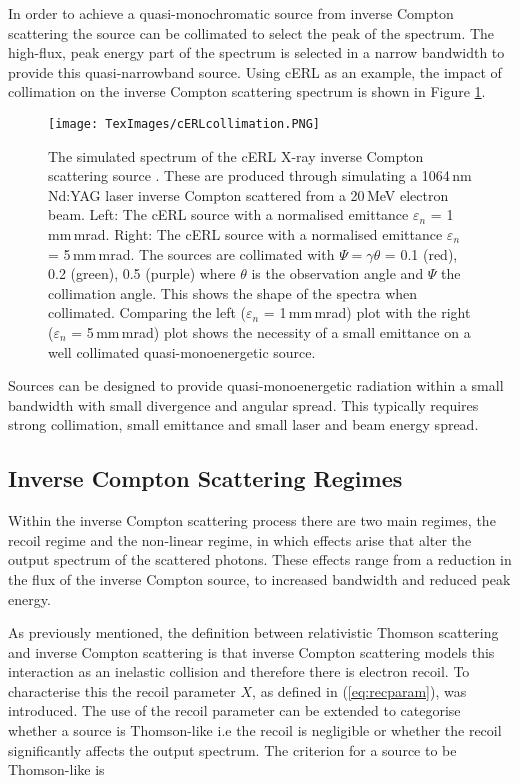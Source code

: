 \documentclass[11pt]{article}
\begin{document}
In order to achieve a quasi-monochromatic source from inverse Compton scattering the source can be collimated to select the peak of the spectrum. The high-flux, peak energy part of the spectrum is selected in a narrow bandwidth to provide this quasi-narrowband source. Using cERL as an example, the impact of collimation on the inverse Compton scattering spectrum is shown in Figure \ref{fig:cERLcoll}.

\begin{figure}[H]
\centering
\texttt{[image: TexImages/cERLcollimation.PNG]}
\caption{\label{fig:cERLcoll} The simulated spectrum of the cERL X-ray inverse Compton scattering source \cite{TAkagicERL}. These are produced through simulating a 1064\,nm Nd:YAG laser inverse Compton scattered from a 20\,MeV electron beam.  Left: The cERL source with a normalised emittance $\varepsilon_{n}$ = 1\,mm\,mrad. Right: The cERL source with a normalised emittance $\varepsilon_{n}$ = 5\,mm\,mrad. The sources are collimated with $\Psi = \gamma\theta$ = 0.1 (red), 0.2 (green), 0.5 (purple) where $\theta$ is the observation angle and $\Psi$ the collimation angle. This shows the shape of the spectra when collimated. Comparing the left ($\varepsilon_{n}$ = 1\,mm\,mrad) plot with the right ($\varepsilon_{n}$ = 5\,mm\,mrad) plot shows the necessity of a small emittance on a well collimated quasi-monoenergetic source.}
\end{figure}

Sources can be designed to provide quasi-monoenergetic radiation within a small bandwidth with small divergence and angular spread. This typically requires strong collimation, small emittance and small laser and beam energy spread.  
     
\subsection{Inverse Compton Scattering Regimes}
\label{sec:regimes}

Within the inverse Compton scattering process there are two main regimes, the recoil regime and the non-linear regime, in which effects arise that alter the output spectrum of the scattered photons. These effects range from a reduction in the flux of the inverse Compton source, to increased bandwidth and reduced peak energy. 

As previously mentioned, the definition between relativistic Thomson scattering and inverse Compton scattering is that inverse Compton scattering models this interaction as an inelastic collision and therefore there is electron recoil. To characterise this the recoil parameter $X$, as defined in (\ref{eq:recparam}), was introduced. The use of the recoil parameter can be extended to categorise whether a source is Thomson-like i.e the recoil is negligible or whether the recoil significantly affects the output spectrum. The criterion for a source to be Thomson-like is 
\end{document}
